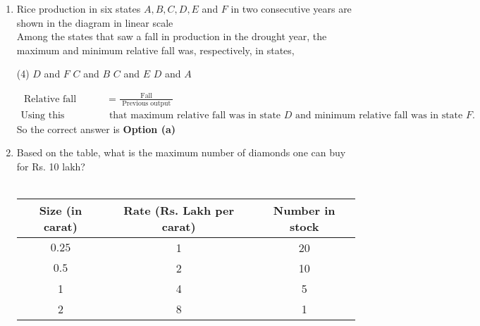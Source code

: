 \begin{enumerate}
 \begin{tasks}(2)
	\task[\textbf{a.}]Anwara rides an Autorikshaw
	\task[\textbf{b.}]Anwara rides a Bus
	\task[\textbf{c.}]Bharati rides a Bus
	\task[\textbf{d.}] Bharati rides a Cycle
\end{tasks}
\begin{answer}
	 Tarun travels by Train. Colin rides neither an Autorickshaw nor a Bus hence Colin definitely travels by Cycle. Here we see that for both Tarun and Colin have their initials match with their mode of transports. Since, the initials of only two persons can match with their mode of transports, hence Anawara must ride a Bus and Bharati must ride an Autorickshaw.\\
	So the correct answer is \textbf{Option (b)}
\end{answer}
\item Rice production in six states $A, B, C, D, E$ and $F$ in two consecutive years are shown in the diagram in linear scale\\
Among the states that saw a fall in production in the drought year, the maximum and minimum relative fall was, respectively, in states,
 \begin{tasks}(4)
	\task[\textbf{a.}]$D$ and $F$
	\task[\textbf{b.}]$C$ and $B$
	\task[\textbf{c.}]$C$ and $E$
	\task[\textbf{d.}] $D$ and $A$
\end{tasks}
\begin{answer}
	\begin{align*}
	\text { Relative fall }&=\frac{\text { Fall }}{\text { Previous output }}\\
	\text{Using this relation we see}&\text{ that maximum relative fall was in state $D$ and minimum relative fall was in state $F$.}
	\end{align*}
		So the correct answer is \textbf{Option (a)}
\end{answer}
\item  Based on the table, what is the maximum number of diamonds one can buy for Rs. 10 lakh?\\\\
\begin{tabular}{|c|c|c|}
	\hline Size (in carat) & Rate (Rs. Lakh per carat) & Number in stock \\
	\hline $0.25$ & 1 & 20 \\
	\hline $0.5$ & 2 & 10 \\
	\hline 1 & 4 & 5 \\
	\hline 2 & 8 & 1 \\
	\hline
\end{tabular}\\\\

\end{enumerate}
